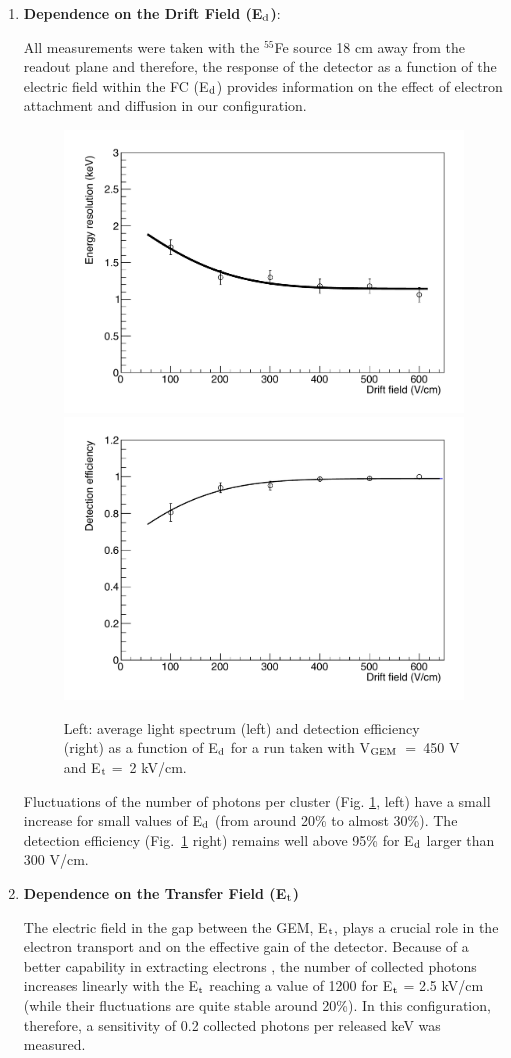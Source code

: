 \documentclass[a4paper]{jpconf}
\begin{document}
\begin{enumerate}
\item \textbf{Dependence on the Drift Field (E$_{\rm d}$)}:

All measurements were taken with the $^{55}$Fe source 18 cm away from
the readout plane and therefore, the response of the detector as a
function of the electric field within the FC (E$_{\rm d}$) provides
information on the effect of electron attachment and diffusion in our
configuration.

\begin{figure}[htbp]
\centering
\includegraphics[width=.45\textwidth]{gEnergyRes_Edrift.pdf}
\includegraphics[width=.45\textwidth]{gEff_Edrift.pdf}
\caption{Left: average light spectrum (left) and  detection efficiency (right) as a function of E$_{\rm d}$ for a run taken with V$_{\rm GEM}$~=~450 V and E$_{\rm t}$ =~2 kV/cm.}
\label{fig:Ed1}
\end{figure}
Fluctuations of the number of photons per cluster (Fig. \ref{fig:Ed1},
left) have a small increase for small values of E$_{\rm d}$ (from
around 20\% to almost 30\%).  The detection efficiency
(Fig.~\ref{fig:Ed1} right) remains well above 95\% for E$_{\rm d}$
larger than 300 V/cm.

\item \textbf{Dependence on the Transfer Field (E$_{\rm t}$)}

The electric field in the gap between the GEM, E$_{\rm t}$, plays a
crucial role in the electron transport and on the effective gain of
the detector.  Because of a better capability in extracting electrons
\cite{bib:thesis}, the number of collected photons increases linearly
with the E$_{\rm t}$ reaching a value of 1200 for E$_{\rm t}$ = 2.5
kV/cm (while their fluctuations are quite stable around 20\%).  In
this configuration, therefore, a sensitivity of 0.2 collected photons
per released keV was measured.

\end{enumerate}
\end{document}
